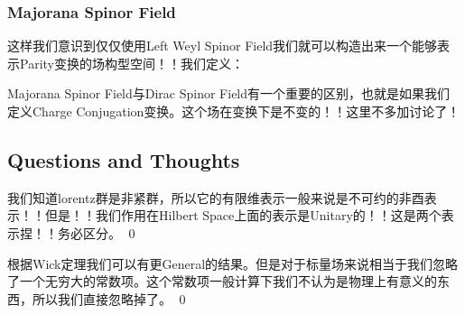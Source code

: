 
    \subsubsection{Majorana Spinor Field}


    这样我们意识到仅仅使用Left Weyl Spinor Field我们就可以构造出来一个能够表示Parity变换的场构型空间！！我们定义：

    \bigskip

    Majorana Spinor Field与Dirac Spinor Field有一个重要的区别，也就是如果我们定义Charge
    Conjugation变换。这个场在变换下是不变的！！这里不多加讨论了！

    \subsection{Questions and Thoughts}


    我们知道lorentz群是非紧群，所以它的有限维表示一般来说是不可约的非酉表示！！但是！！我们作用在Hilbert
    Space上面的表示是Unitary的！！这是两个表示捏！！务必区分。
    \qed

    根据Wick定理我们可以有更General的结果。但是对于标量场来说相当于我们忽略了一个无穷大的常数项。这个常数项一般计算下我们不认为是物理上有意义的东西，所以我们直接忽略掉了。
    \qed
